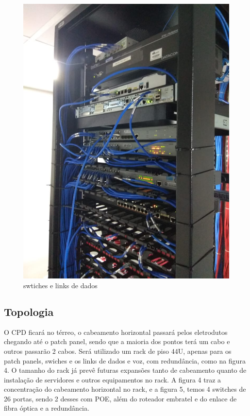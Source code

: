 \documentclass[	DIV=calc,%
							paper=a4,%
							fontsize=12pt,%
							onecolumn]{scrartcl}	 					%
\begin{document}
\begin{figure}
	\centering
	\includegraphics[width=\textwidth]{fig5}
	\caption{swtiches e links de dados}
	\label{leg}
\end{figure}



\subsection{Topologia}

O CPD ficará no térreo, o cabeamento horizontal passará pelos eletrodutos chegando até o patch panel, sendo que a maioria dos pontos terá um cabo e outros passarão 2 cabos. Será utilizado um rack de piso 44U, apenas para os patch panels, swiches e os links de dados e voz, com redundância, como na figura 4. O tamanho do rack já prevê futuras expansões tanto de cabeamento quanto de instalação de servidores e outros equipamentos no rack. A figura 4 traz a concentração do cabeamento horizontal no rack, e a figura 5, temos 4 switches de 26 portas, sendo 2 desses com POE, além do roteador embratel e do enlace de fibra óptica e a redundância. 
\end{document}
